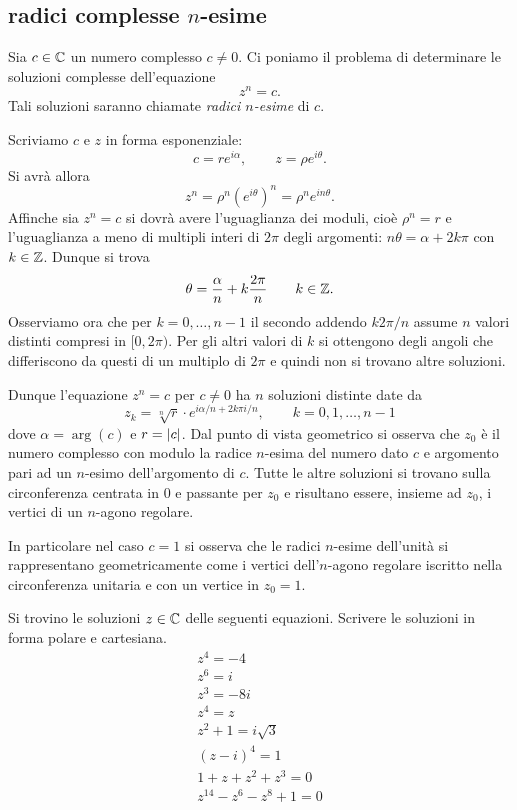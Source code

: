 \subsection{radici complesse $n$-esime}

Sia $c\in {\mathbb C}$ un numero
complesso $c\neq 0$.
Ci poniamo il problema di determinare le soluzioni complesse
dell'equazione
\[
  z^n = c.
\]
Tali soluzioni saranno chiamate \emph{radici $n$-esime}%
%
 di $c$.

Scriviamo $c$ e $z$ in forma esponenziale:
\[
  c = r e^{i\alpha}, \qquad
  z = \rho e^{i\theta}.
\]
Si avrà allora
\[
  z^n = \rho^n (e^{i\theta})^n = \rho^n e^{i n \theta}.
\]
Affinche sia $z^n = c$ si dovrà avere l'uguaglianza dei moduli, cioè $\rho^n = r$ e l'uguaglianza a meno di multipli interi di $2\pi$ degli argomenti:
$n \theta = \alpha + 2 k \pi$ con $k\in {\mathbb Z}$.
Dunque si trova
\[
  \theta = \frac{\alpha}{n} + k\frac{2\pi}{n}
\qquad k \in {\mathbb Z}.
\]
Osserviamo ora che per $k=0,\dots, n-1$ il secondo addendo
$k 2\pi /n$ assume $n$ valori distinti compresi in $[0,2\pi)$.
Per gli altri valori di $k$ si ottengono degli angoli che differiscono
da questi di un multiplo di $2\pi$ e quindi non si trovano
altre soluzioni.

Dunque l'equazione $z^n = c$ per $c\neq 0$ ha $n$ soluzioni distinte date
da
\[
z_k = \sqrt[n]{r} \cdot e^{i\alpha/n + 2k\pi i /n},
\qquad k=0,1, \dots, n-1
\]
dove $\alpha = \arg(c)$ e $r = {\left|c\right|}$.
Dal punto di vista geometrico si osserva che
$z_0$ è il numero complesso con modulo la radice $n$-esima del numero
dato $c$ e argomento pari ad un $n$-esimo dell'argomento di $c$.
Tutte le altre soluzioni si trovano sulla circonferenza centrata in $0$
e passante per $z_0$ e risultano essere, insieme ad $z_0$, i vertici
di un $n$-agono regolare.

In particolare nel caso $c=1$ si osserva che le radici $n$-esime dell'unità
si rappresentano geometricamente come i vertici dell'$n$-agono regolare iscritto
nella circonferenza unitaria e con un vertice in $z_0=1$.

\begin{exercise}
Si trovino le soluzioni $z \in {\mathbb C}$ delle seguenti equazioni.
Scrivere le soluzioni in forma polare e cartesiana.
\begin{gather*}
   z^4 = -4 \\
   z^6 = i\\
   z^3 = -8i \\
   z^4 = z\\
   z^2 + 1 = i\sqrt{3} \\
   (z-i)^4 = 1\\
   1 + z + z^2 + z^3 = 0\\
   z^{14} - z^6 - z^8 + 1 = 0
\end{gather*}
\end{exercise}

